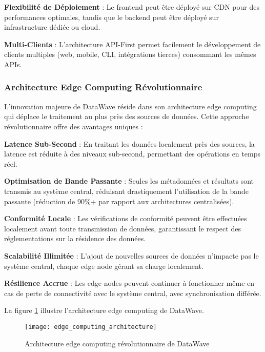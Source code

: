 \textbf{Flexibilité de Déploiement} : Le frontend peut être déployé sur CDN pour des performances optimales, tandis que le backend peut être déployé sur infrastructure dédiée ou cloud.

\textbf{Multi-Clients} : L'architecture API-First permet facilement le développement de clients multiples (web, mobile, CLI, intégrations tierces) consommant les mêmes APIs.

\subsubsection{Architecture Edge Computing Révolutionnaire}

L'innovation majeure de DataWave réside dans son architecture edge computing qui déplace le traitement au plus près des sources de données. Cette approche révolutionnaire offre des avantages uniques :

\textbf{Latence Sub-Second} : En traitant les données localement près des sources, la latence est réduite à des niveaux sub-second, permettant des opérations en temps réel.

\textbf{Optimisation de Bande Passante} : Seules les métadonnées et résultats sont transmis au système central, réduisant drastiquement l'utilisation de la bande passante (réduction de 90\%+ par rapport aux architectures centralisées).

\textbf{Conformité Locale} : Les vérifications de conformité peuvent être effectuées localement avant toute transmission de données, garantissant le respect des réglementations sur la résidence des données.

\textbf{Scalabilité Illimitée} : L'ajout de nouvelles sources de données n'impacte pas le système central, chaque edge node gérant sa charge localement.

\textbf{Résilience Accrue} : Les edge nodes peuvent continuer à fonctionner même en cas de perte de connectivité avec le système central, avec synchronisation différée.

La figure \ref{fig:edge_computing} illustre l'architecture edge computing de DataWave.

\begin{figure}[htpb]
\centering
\texttt{[image: edge\_computing\_architecture]}
\caption{Architecture edge computing révolutionnaire de DataWave}
\label{fig:edge_computing}
\end{figure}

